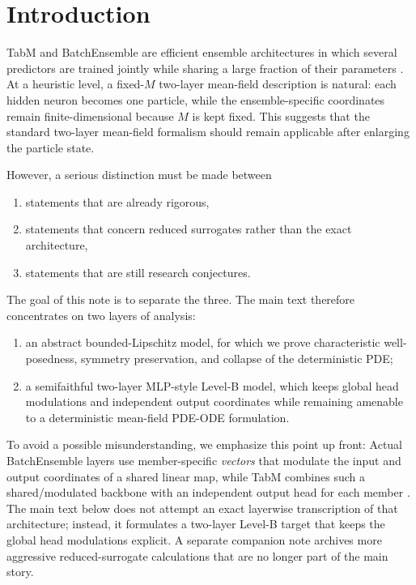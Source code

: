 \documentclass[11pt]{article}
\theoremstyle{definition}
\begin{document}
\section{Introduction}

TabM and BatchEnsemble are efficient ensemble architectures in which several predictors are trained jointly while sharing a large fraction of their parameters
\cite{tabm,batchensemble}.
At a heuristic level, a fixed-$M$ two-layer mean-field description is natural:
each hidden neuron becomes one particle, while the ensemble-specific coordinates remain finite-dimensional because $M$ is kept fixed.
This suggests that the standard two-layer mean-field formalism
\cite{mei2018,mei2019}
should remain applicable after enlarging the particle state.

However, a serious distinction must be made between
\begin{enumerate}[leftmargin=2em]
  \item statements that are already rigorous,
  \item statements that concern reduced surrogates rather than the exact architecture,
  \item statements that are still research conjectures.
\end{enumerate}
The goal of this note is to separate the three.
The main text therefore concentrates on two layers of analysis:
\begin{enumerate}[leftmargin=2em]
  \item an abstract bounded-Lipschitz model, for which we prove characteristic well-posedness, symmetry preservation, and collapse of the deterministic PDE;
  \item a semifaithful two-layer MLP-style Level-B model, which keeps global head modulations and independent output coordinates while remaining amenable to a deterministic mean-field PDE-ODE formulation.
\end{enumerate}

To avoid a possible misunderstanding, we emphasize this point up front:
Actual BatchEnsemble layers use member-specific \emph{vectors} that modulate the input and output coordinates of a shared linear map,
while TabM combines such a shared/modulated backbone with an independent output head for each member
\cite{batchensemble,tabm,tabm-repo}.
The main text below does not attempt an exact layerwise transcription of that architecture;
instead, it formulates a two-layer Level-B target that keeps the global head modulations explicit.
A separate companion note archives more aggressive reduced-surrogate calculations that are no longer part of the main story.
\end{document}
